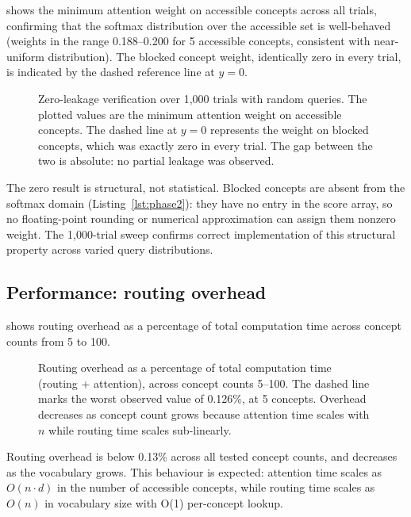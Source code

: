 \documentclass[11pt,a4paper]{article}
\theoremstyle{definition}
\begin{document}
 shows the minimum attention weight on accessible concepts
across all trials, confirming that the softmax distribution over the
accessible set is well-behaved (weights in the range 0.188--0.200 for 5
accessible concepts, consistent with near-uniform distribution). The blocked
concept weight, identically zero in every trial, is indicated by the dashed
reference line at $y=0$.

\begin{figure}[h]
\centering

\caption{Zero-leakage verification over 1{,}000 trials with random queries.
The plotted values are the minimum attention weight on accessible concepts.
The dashed line at $y=0$ represents the weight on blocked concepts, which was
exactly zero in every trial. The gap between the two is absolute: no partial
leakage was observed.}
\label{fig:leakage}
\end{figure}

The zero result is structural, not statistical. Blocked concepts are absent
from the softmax domain (Listing~\ref{lst:phase2}): they have no entry in the score array, so no
floating-point rounding or numerical approximation can assign them nonzero
weight. The 1{,}000-trial sweep confirms correct implementation of this
structural property across varied query distributions.

\subsection{Performance: routing overhead}
\label{sec:perf}

 shows routing overhead as a percentage of total
computation time across concept counts from 5 to 100.

\begin{figure}[h]
\centering

\caption{Routing overhead as a percentage of total computation time
(routing + attention), across concept counts 5--100. The dashed line marks
the worst observed value of 0.126\%, at 5 concepts. Overhead decreases as
concept count grows because attention time scales with $n$ while routing time
scales sub-linearly.}
\label{fig:overhead}
\end{figure}

Routing overhead is below 0.13\% across all tested concept counts, and
decreases as the vocabulary grows. This behaviour is expected: attention time
scales as $O(n \cdot d)$ in the number of accessible concepts, while routing
time scales as $O(n)$ in vocabulary size with O(1) per-concept lookup.
\end{document}

